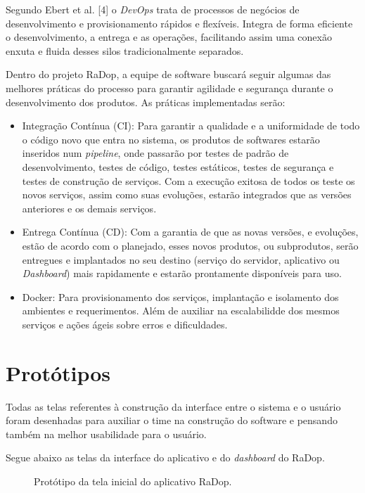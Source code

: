 Segundo Ebert et al. [4] o \textit{DevOps} trata de processos de negócios de desenvolvimento e provisionamento rápidos e flexíveis. Integra de forma eficiente o desenvolvimento, a entrega e as operações, facilitando assim uma conexão enxuta e fluida desses silos tradicionalmente separados.

Dentro do projeto RaDop, a equipe de software buscará seguir algumas das melhores práticas do processo para garantir agilidade e segurança durante o desenvolvimento dos produtos. As práticas implementadas serão:
\begin{itemize}
    \item Integração Contínua (CI): Para garantir a qualidade e a uniformidade de todo o código novo que entra no sistema, os produtos de softwares estarão inseridos num \textit{pipeline}, onde passarão por testes de padrão de desenvolvimento, testes de código, testes estáticos, testes de segurança e testes de construção de serviços. Com a execução exitosa de todos os teste os novos serviços, assim como suas evoluções, estarão integrados que as versões anteriores e os demais serviços.
    \item Entrega Contínua (CD): Com a garantia de que as novas versões, e evoluções, estão de acordo com o planejado, esses novos produtos, ou subprodutos, serão entregues e implantados no seu destino (serviço do servidor, aplicativo ou \textit{Dashboard}) mais rapidamente e estarão prontamente disponíveis para uso.
    \item Docker: Para provisionamento dos serviços, implantação e isolamento dos ambientes e requerimentos. Além de auxiliar na escalabilidde dos mesmos serviços e ações ágeis sobre erros e dificuldades.
\end{itemize}

\section{Protótipos}

Todas as telas referentes à construção da interface entre o sistema e o usuário foram desenhadas para auxiliar o time na construção do software e pensando também na melhor usabilidade para o usuário.

Segue abaixo as telas da interface do aplicativo e do \textit{dashboard} do RaDop.

\begin{figure}[ht]
	\caption{\label{fig:tela_inicial} Protótipo da tela inicial do aplicativo RaDop.}
\end{figure}\newpage

